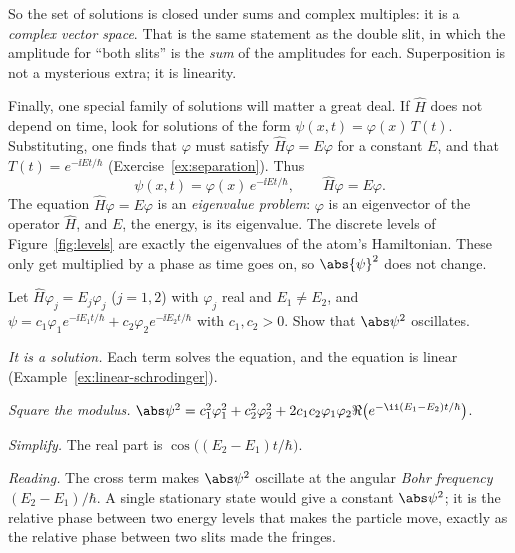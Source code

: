 So the set of solutions is closed under sums and complex multiples: it is a \emph{complex vector space}. That is the same statement as the double slit, in which the amplitude for ``both slits'' is the \emph{sum} of the amplitudes for each. Superposition is not a mysterious extra; it is linearity.

Finally, one special family of solutions will matter a great deal. If $\hat H$ does not depend on time, look for solutions of the form $\psi(x,t)=\varphi(x)\,T(t)$. Substituting, one finds that $\varphi$ must satisfy $\hat H\varphi=E\varphi$ for a constant $E$, and that $T(t)=e^{-\ii Et/\hbar}$ (Exercise~\ref{ex:separation}). Thus
\[
  \psi(x,t)=\varphi(x)\,e^{-\ii Et/\hbar},\qquad \hat H\varphi=E\varphi .
\]
The equation $\hat H\varphi=E\varphi$ is an \emph{eigenvalue problem}: $\varphi$ is an eigenvector of the operator $\hat H$, and $E$, the energy, is its eigenvalue. The discrete levels of Figure~\ref{fig:levels} are exactly the eigenvalues of the atom's Hamiltonian. These  only get multiplied by a phase as time goes on, so $\abs{\psi}^2$ does not change.

\begin{example}\label{ex:two-stationary}
  Let $\hat H\varphi_j=E_j\varphi_j$ ($j=1,2$) with $\varphi_j$ real and $E_1\neq E_2$, and $\psi=c_1\varphi_1e^{-\ii E_1t/\hbar}+c_2\varphi_2e^{-\ii E_2t/\hbar}$ with $c_1,c_2>0$. Show that $\abs\psi^2$ oscillates.
\end{example}
\begin{solution}
  \begin{steps}
    \item \emph{It is a solution.} Each term solves the equation, and the equation is linear (Example~\ref{ex:linear-schrodinger}).
    \item \emph{Square the modulus.} $\abs\psi^2=c_1^2\varphi_1^2+c_2^2\varphi_2^2+2c_1c_2\varphi_1\varphi_2\Re\bigl(e^{-\ii(E_1-E_2)t/\hbar}\bigr)$.
    \item \emph{Simplify.} The real part is $\cos\bigl((E_2-E_1)t/\hbar\bigr)$.
    \item \emph{Reading.} The cross term makes $\abs\psi^2$ oscillate at the angular \emph{Bohr frequency} $(E_2-E_1)/\hbar$. A single stationary state would give a constant $\abs\psi^2$; it is the relative phase between two energy levels that makes the particle move, exactly as the relative phase between two slits made the fringes.
  \end{steps}
\end{solution}

